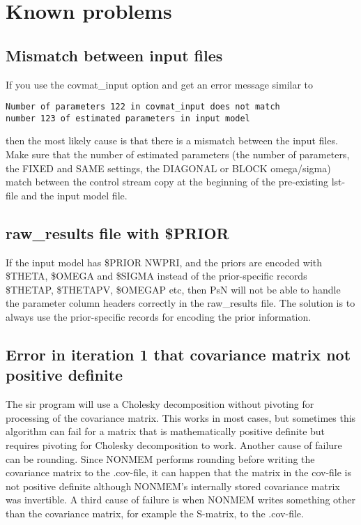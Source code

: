 \section{Known problems}
\subsection*{Mismatch between input files}
If you use the covmat\_input option and get an error message similar to
\begin{verbatim}
Number of parameters 122 in covmat_input does not match 
number 123 of estimated parameters in input model
\end{verbatim}
then the most likely cause is that there is a mismatch between the input files. Make sure that the number of
estimated parameters (the number of parameters, the FIXED and SAME settings, the DIAGONAL or BLOCK omega/sigma)
match between the control stream copy at the beginning of the pre-existing lst-file and the input model file.
\subsection*{raw\_results file with \$PRIOR}
If the input model has \$PRIOR NWPRI, and the priors are encoded with \$THETA, \$OMEGA and \$SIGMA instead of the
prior-specific records \$THETAP, \$THETAPV, \$OMEGAP etc, then PsN will not be able to handle the parameter column
headers correctly in the raw\_results file. The solution is to always use the prior-specific records for
encoding the prior information.
\subsection*{Error in iteration 1 that covariance matrix not positive definite}
The sir program will use a Cholesky decomposition without pivoting for processing of the covariance matrix. 
This works in most cases, but sometimes this algorithm can fail for a matrix that is mathematically positive definite
but requires pivoting for Cholesky decomposition to work. Another cause of failure can be rounding. 
Since NONMEM performs rounding before writing 
the covariance matrix to the .cov-file, it can happen that the matrix in the cov-file is not positive definite
although NONMEM's internally stored covariance matrix was invertible. A third cause of failure
is when NONMEM writes something other than the covariance matrix, for example the S-matrix, to the .cov-file.

